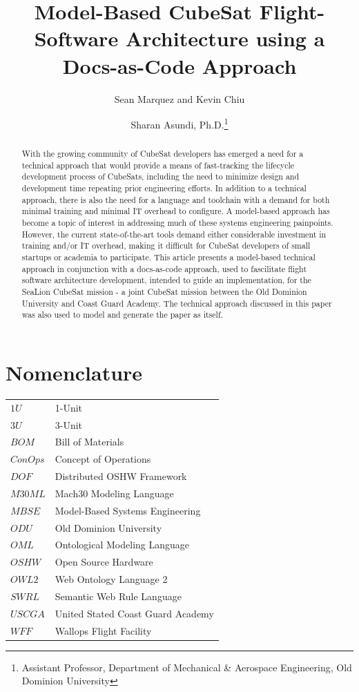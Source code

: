 \documentclass[conf]{new-aiaa}
\title{Model-Based CubeSat Flight-Software Architecture using a Docs-as-Code Approach}
\author{Sean Marquez and Kevin Chiu }
\affil{Old Dominion University, Norfolk, VA, 23529}
\author{Sharan Asundi, Ph.D.\footnote{Assistant Professor, Department of Mechanical \& Aerospace Engineering, Old Dominion University} }
\affil{Old Dominion University, Norfolk, VA, 23529}
\begin{document}
\maketitle

\begin{abstract}
With the growing community of CubeSat developers has emerged a need for a technical approach that would provide a means of fast-tracking the lifecycle development process of CubeSats, including the need to minimize design and development time repeating prior engineering efforts. In addition to a technical approach, there is also the need for a language and toolchain with a demand for both minimal training and minimal IT overhead to configure. A model-based approach has become a topic of interest in addressing much of these systems engineering painpoints. However, the current state-of-the-art tools demand either considerable investment in training and/or IT overhead, making it difficult for CubeSat developers of small startups or academia to participate. This article presents a model-based technical approach in conjunction with a docs-as-code approach, used to fascilitate flight software architecture development, intended to guide an implementation, for the SeaLion CubeSat mission - a joint CubeSat mission between the Old Dominion University and Coast Guard Academy. The technical approach discussed in this paper was also used to model and generate the paper as itself.

\end{abstract}


\section{Nomenclature}

\begin{center}
{\renewcommand\arraystretch{1.0}
\noindent\begin{longtable*}{@{}l @{\quad=\quad} l@{}}
$1U$ & 1-Unit \\
$3U$ & 3-Unit \\
$BOM$  & Bill of Materials \\
$ConOps$  & Concept of Operations \\
$DOF$  & Distributed OSHW Framework  \\
$M30ML$  & Mach30 Modeling Language \\
$MBSE$ & Model-Based Systems Engineering  \\
$ODU$ & Old Dominion University \\
$OML$  & Ontological Modeling Language \\
$OSHW$ & Open Source Hardware \\
$OWL2$ & Web Ontology Language 2 \\
$SWRL$ & Semantic Web Rule Language \\
$USCGA$ & United Stated Coast Guard Academy \\
$WFF$   & Wallops Flight Facility  
\end{longtable*}}
\end{center}
\end{document}
